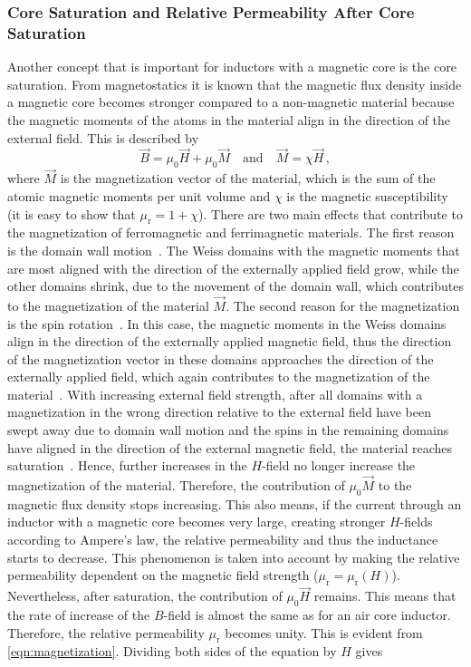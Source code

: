 \subsubsection{Core Saturation and Relative Permeability After Core Saturation}
Another concept that is important for inductors with a magnetic core is the core saturation. From magnetostatics it is known that the magnetic flux density inside a magnetic core becomes stronger compared to a non-magnetic material because the magnetic moments of the atoms in the material align in the direction of the external field. This is described by
\begin{equation}\label{eqn:magnetization}
	\vec{B} = \mu_0\vec{H}+\mu_0\vec{M}
	\quad\mathrm{and}\quad
	\vec{M} = \chi\vec{H}\,,
\end{equation} 
where $\vec{M}$ is the magnetization vector of the material, which is the sum of the atomic magnetic moments per unit volume and $\chi$ is the magnetic susceptibility (it is easy to show that $\mu_\mathrm{r} = 1 + \chi$). There are two main effects that contribute to the magnetization of ferromagnetic and ferrimagnetic materials. The first reason is the domain wall motion~\cite{wijn}. The Weiss domains with the magnetic moments that are most aligned with the direction of the externally applied field grow, while the other domains shrink, due to the movement of the domain wall, which contributes to the magnetization of the material $\vec{M}$. The second reason for the magnetization is the spin rotation~\cite{wijn}. In this case, the magnetic moments in the Weiss domains align in the direction of the externally applied magnetic field, thus the direction of the magnetization vector in these domains approaches the direction of the externally applied field, which again contributes to the magnetization of the material~\cite{wijn}. With increasing external field strength, after all domains with a magnetization in the wrong direction relative to the external field have been swept away due to domain wall motion and the spins in the remaining domains have aligned in the direction of the external magnetic field, the material reaches saturation~\cite{snelling}. Hence, further increases in the $H$-field no longer increase the magnetization of the material. Therefore, the contribution of $\mu_0\vec{M}$ to the magnetic flux density stops increasing. This also means, if the current through an inductor with a magnetic core becomes very large, creating stronger $H$-fields according to Ampere's law, the relative permeability and thus the inductance starts to decrease. This phenomenon is taken into account by making the relative permeability dependent on the magnetic field strength ($\mu_\mathrm{r} = \mu_\mathrm{r}(H)$). Nevertheless, after saturation, the contribution of $\mu_0\vec{H}$ remains. This means that the rate of increase of the $B$-field is almost the same as for an air core inductor. Therefore, the relative permeability $\mu_\mathrm{r}$ becomes unity. This is evident from \eqref{eqn:magnetization}. Dividing both sides of the equation by $H$ gives 
